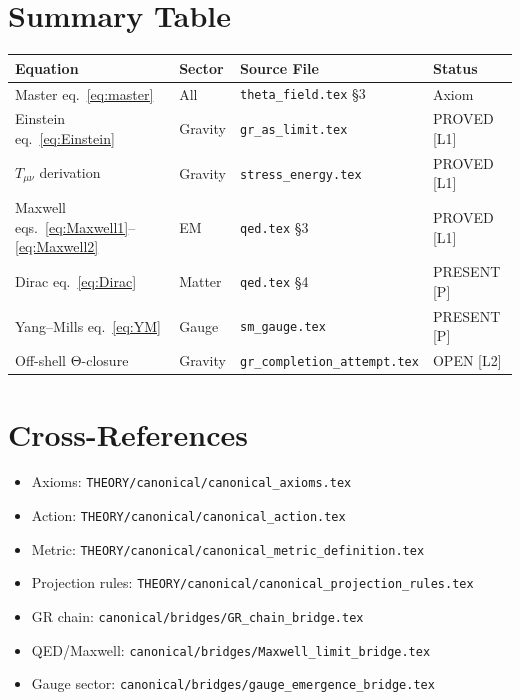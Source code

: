 \documentclass[11pt,a4paper]{article}
\begin{document}
\section{Summary Table}

\begin{center}
\begin{tabular}{llll}
\hline
\textbf{Equation} & \textbf{Sector} & \textbf{Source File} & \textbf{Status} \\
\hline
Master eq.\ \eqref{eq:master} & All & \texttt{theta\_field.tex} \S3 & Axiom \\
Einstein eq.\ \eqref{eq:Einstein} & Gravity & \texttt{gr\_as\_limit.tex} & PROVED [L1] \\
$T_{\mu\nu}$ derivation & Gravity & \texttt{stress\_energy.tex} & PROVED [L1] \\
Maxwell eqs.\ \eqref{eq:Maxwell1}--\eqref{eq:Maxwell2} & EM & \texttt{qed.tex} \S3 & PROVED [L1] \\
Dirac eq.\ \eqref{eq:Dirac} & Matter & \texttt{qed.tex} \S4 & PRESENT [P] \\
Yang--Mills eq.\ \eqref{eq:YM} & Gauge & \texttt{sm\_gauge.tex} & PRESENT [P] \\
Off-shell Θ-closure & Gravity & \texttt{gr\_completion\_attempt.tex} & OPEN [L2] \\
\hline
\end{tabular}
\end{center}

\section{Cross-References}

\begin{itemize}
  \item Axioms: \texttt{THEORY/canonical/canonical\_axioms.tex}
  \item Action: \texttt{THEORY/canonical/canonical\_action.tex}
  \item Metric: \texttt{THEORY/canonical/canonical\_metric\_definition.tex}
  \item Projection rules: \texttt{THEORY/canonical/canonical\_projection\_rules.tex}
  \item GR chain: \texttt{canonical/bridges/GR\_chain\_bridge.tex}
  \item QED/Maxwell: \texttt{canonical/bridges/Maxwell\_limit\_bridge.tex}
  \item Gauge sector: \texttt{canonical/bridges/gauge\_emergence\_bridge.tex}
\end{itemize}
\end{document}
